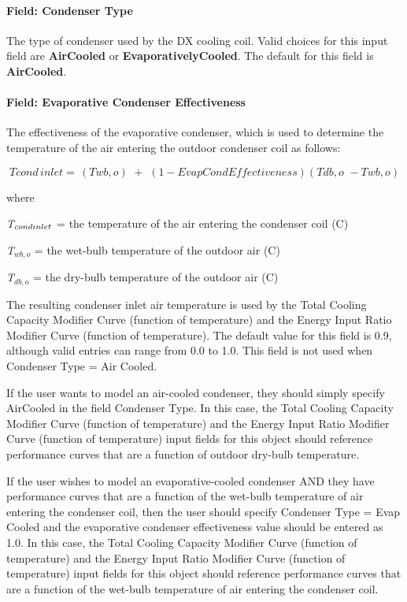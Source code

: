 \paragraph{Field: Condenser Type}\label{field-condenser-type}

The type of condenser used by the DX cooling coil. Valid choices for this input field are \textbf{AirCooled} or \textbf{EvaporativelyCooled}. The default for this field is \textbf{AirCooled}.

\paragraph{Field: Evaporative Condenser Effectiveness}\label{field-evaporative-condenser-effectiveness}

The effectiveness of the evaporative condenser, which is used to determine the temperature of the air entering the outdoor condenser coil as follows:

\begin{equation}
Tcond\,inlet = \,\left( {Twb,o} \right)\,\, + \,\,\left( {1 - EvapCondEffectiveness} \right)\left( {Tdb,o\,\, - Twb,o} \right)
\end{equation}

where

\emph{T\(_{cond\\ inlet}\)} = the temperature of the air entering the condenser coil (C)

\emph{T\(_{wb,o}\)} = the wet-bulb temperature of the outdoor air (C)

\emph{T\(_{db,o}\)} = the dry-bulb temperature of the outdoor air (C)

The resulting condenser inlet air temperature is used by the Total Cooling Capacity Modifier Curve (function of temperature) and the Energy Input Ratio Modifier Curve (function of temperature). The default value for this field is 0.9, although valid entries can range from 0.0 to 1.0. This field is not used when Condenser Type = Air Cooled.

If the user wants to model an air-cooled condenser, they should simply specify AirCooled in the field Condenser Type. In this case, the Total Cooling Capacity Modifier Curve (function of temperature) and the Energy Input Ratio Modifier Curve (function of temperature) input fields for this object should reference performance curves that are a function of outdoor dry-bulb temperature.

If the user wishes to model an evaporative-cooled condenser AND they have performance curves that are a function of the wet-bulb temperature of air entering the condenser coil, then the user should specify Condenser Type = Evap Cooled and the evaporative condenser effectiveness value should be entered as 1.0. In this case, the Total Cooling Capacity Modifier Curve (function of temperature) and the Energy Input Ratio Modifier Curve (function of temperature) input fields for this object should reference performance curves that are a function of the wet-bulb temperature of air entering the condenser coil.

